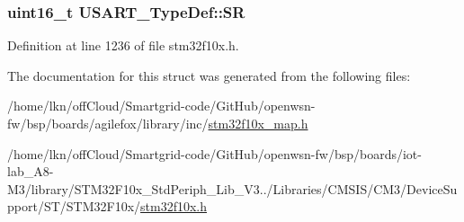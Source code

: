 \subsubsection[{\texorpdfstring{SR}{SR}}]{ {\bf uint16\+\_\+t} U\+S\+A\+R\+T\+\_\+\+Type\+Def\+::\+SR}\hypertarget{struct_u_s_a_r_t___type_def_a3f1fd9f0c004d3087caeba4815faa41c}{}\label{struct_u_s_a_r_t___type_def_a3f1fd9f0c004d3087caeba4815faa41c}


Definition at line 1236 of file stm32f10x.\+h.



The documentation for this struct was generated from the following files\+:\begin{DoxyCompactItemize}
\item 
/home/lkn/off\+Cloud/\+Smartgrid-\/code/\+Git\+Hub/openwsn-\/fw/bsp/boards/agilefox/library/inc/\hyperlink{agilefox_2library_2inc_2stm32f10x__map_8h}{stm32f10x\+\_\+map.\+h}\item 
/home/lkn/off\+Cloud/\+Smartgrid-\/code/\+Git\+Hub/openwsn-\/fw/bsp/boards/iot-\/lab\+\_\+\+A8-\/\+M3/library/\+S\+T\+M32\+F10x\+\_\+\+Std\+Periph\+\_\+\+Lib\+\_\+\+V3../\+Libraries/\+C\+M\+S\+I\+S/\+C\+M3/\+Device\+Support/\+S\+T/\+S\+T\+M32\+F10x/\hyperlink{iot-lab___a8-_m3_2library_2_s_t_m32_f10x___std_periph___lib___v3_85_80_2_libraries_2_c_m_s_i_s_26497265545392eb5694b064ae15018db}{stm32f10x.\+h}\end{DoxyCompactItemize}
